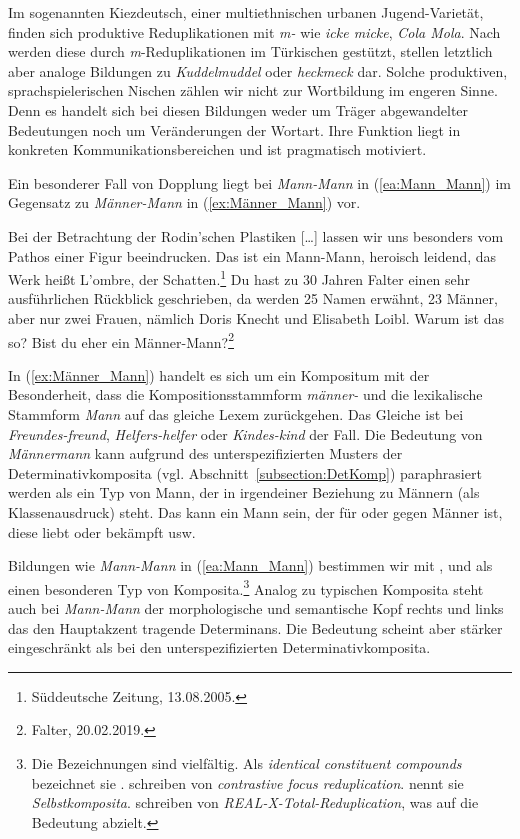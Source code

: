 Im sogenannten Kiezdeutsch, einer multiethnischen urbanen Jugend-Varietät, finden sich produktive Reduplikationen mit \textit{m-} wie \textit{icke micke}, \textit{Cola Mola}. Nach \citet[325]{Wiese2015} werden diese durch \textit{m}-Reduplikationen im Türkischen gestützt, stellen letztlich aber analoge Bildungen zu \textit{Kuddelmuddel} oder \textit{heckmeck} dar. Solche produktiven, sprachspielerischen Nischen zählen wir nicht zur Wortbildung im engeren Sinne. Denn es handelt sich bei diesen Bildungen weder um Träger abgewandelter Bedeutungen noch um Veränderungen der Wortart. Ihre Funktion liegt in konkreten Kommunikationsbereichen und ist pragmatisch motiviert.

Ein besonderer Fall von Dopplung liegt bei \textit{Mann-Mann} in (\ref{ea:Mann_Mann}) im Gegensatz zu \textit{Männer-Mann} in (\ref{ex:Männer_Mann}) vor.

\ea \label{ea:Redupl_Mann}
\ea \label{ea:Mann_Mann} Bei der Betrachtung der Rodin'schen Plastiken [\ldots{}] lassen wir uns besonders vom Pathos einer Figur beeindrucken. Das ist ein Mann-Mann, heroisch leidend, das Werk heißt L’ombre, der Schatten.\footnote{ Süddeutsche Zeitung, 13.08.2005.}
\ex \label{ex:Männer_Mann} Du hast zu 30 Jahren Falter einen sehr ausführlichen Rückblick geschrieben, da werden 25 Namen erwähnt, 23 Männer, aber nur zwei Frauen, nämlich Doris Knecht und Elisabeth Loibl. Warum ist das so? Bist du eher ein Männer-Mann?\footnote{Falter, 20.02.2019.}
\z 
\z 

In (\ref{ex:Männer_Mann}) handelt es sich um ein Kompositum mit der Besonderheit, dass die Kompositionsstammform \textit{männer-} und die lexikalische Stammform \textit{Mann} auf das gleiche Lexem zurückgehen. Das Gleiche ist bei \textit{Freundes-freund}, \textit{Helfers-helfer} oder \textit{Kindes-kind} der Fall. Die Bedeutung von \textit{Männermann} kann aufgrund des unterspezifizierten Musters der Determinativkomposita (vgl. Abschnitt~\ref{subsection:DetKomp}) paraphrasiert werden als ein Typ von Mann, der in irgendeiner Beziehung zu Männern (als Klassenausdruck) steht. Das kann ein Mann sein, der für oder gegen Männer ist, diese liebt oder bekämpft usw. 

Bildungen wie \textit{Mann-Mann} in (\ref{ea:Mann_Mann}) bestimmen wir mit \citet[299--302]{Hohenhaus2004}, \citet[72]{Donalies2011BasisWB} und \citet[240]{Kentner2017} als einen besonderen Typ von Komposita.\footnote{Die Bezeichnungen sind vielfältig. Als \textit{identical constituent compounds} bezeichnet sie \citet[297]{Hohenhaus2004}. \citet{Ghomeshi_al_2004salad} schreiben von \textit{contrastive focus reduplication}. \citet[72]{Donalies2011BasisWB} nennt sie \textit{Selbstkomposita}. \citet[199]{Stolz_al_2011Redupl} schreiben von \textit{REAL-X-Total-Reduplication}, was auf die Bedeutung  abzielt.} Analog zu typischen Komposita steht auch bei \textit{Mann-Mann} der morphologische und semantische Kopf rechts und links das den Hauptakzent tragende Determinans. Die Bedeutung scheint aber stärker eingeschränkt als bei den unterspezifizierten Determinativkomposita.

